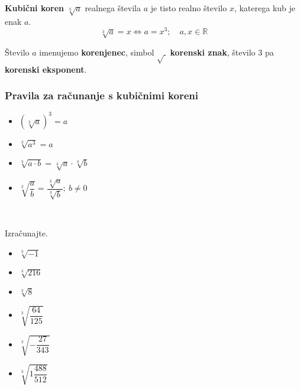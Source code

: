         

            
                \textbf{Kubični koren} $\sqrt[3]{a}$ realnega števila $a$ je tisto realno število $x$,
                katerega kub je enak $a$.
                $$\sqrt[3]{a}=x \Leftrightarrow a=x^3; \quad a,x\in\mathbb{R}$$

                Število $a$ imenujemo \textbf{korenjenec}, simbol $\sqrt{~}$ \textbf{korenski znak}, število $3$ pa \textbf{korenski eksponent}.
            

            \subsubsection*{Pravila za računanje s kubičnimi koreni}
                
                    \begin{itemize}
                        \item $\left(\sqrt[3]{a}\right)^3=a$
                        \item $\sqrt[3]{a^3}=a$
                        \item $\sqrt[3]{a\cdot b}=\sqrt[3]{a}\cdot\sqrt[3]{b}$
                        \item $\sqrt[3]{\dfrac{a}{b}}=\dfrac{\sqrt[3]{a}}{\sqrt[3]{b}}; ~b\neq 0$
                    \end{itemize}
                
            

                    ~~~


        
            \begin{naloga}
                Izračunajte.
                \begin{itemize}
                    
                        \item $\sqrt[3]{-1}$ 
                        \item $\sqrt[3]{216}$ 
                        \item $\sqrt[3]{8}$ 
                        \item $\sqrt[3]{\dfrac{64}{125}}$ 
                        \item $\sqrt[3]{-\dfrac{27}{343}}$ 
                        \item $\sqrt[3]{1\dfrac{488}{512}}$ 
                    

                \end{itemize}
            \end{naloga}
        


